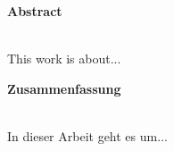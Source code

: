 

\begin{center}
\large \textbf{Abstract} \\
~\\ %
\end{center}
This work is about...

\vfill %
\begin{center}
\large \textbf{Zusammenfassung} \\
~\\ %
\end{center}
In dieser Arbeit geht es um...
